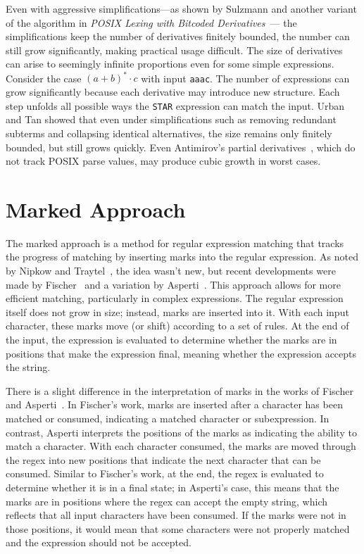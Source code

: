 \documentclass[12pt]{article}
\begin{document}
Even with aggressive simplifications—as shown by Sulzmann and another variant of the algorithm in \emph{POSIX Lexing with Bitcoded Derivatives}~\cite{TanAndUrban2023}— 
the simplifications keep the number of derivatives finitely bounded, the number can still grow significantly, making practical usage difficult.
The size of derivatives can arise to seemingly infinite proportions even for some simple expressions. Consider the case \( (a + b)^* \cdot c \)
with input \texttt{aaac}. The number of expressions can grow significantly because each derivative may introduce new structure. Each step 
unfolds all possible ways the \texttt{STAR} expression can match the input. Urban and Tan showed that even under simplifications such as 
removing redundant subterms and collapsing identical alternatives, the size remains only finitely bounded, but still grows quickly.
Even Antimirov’s partial derivatives~\cite{Antimirov1996}, which do not track POSIX parse values, may produce cubic growth in worst cases.

\section{Marked Approach}

The marked approach is a method for regular expression matching that tracks the progress of matching by inserting marks into the regular expression.
As noted by Nipkow and Traytel~\cite{NipkowTraytel2014}, the idea wasn't new, but recent developments were made by Fischer~\cite{Fischer2010} and a 
variation by Asperti~\cite{Asperti2010}. This approach allows for more efficient matching, particularly in complex expressions. The regular expression
itself does not grow in size; instead, marks are inserted into it. With each input character, these marks move (or shift) according to a set of rules.
At the end of the input, the expression is evaluated to determine whether the marks are in positions that make the expression final, meaning whether 
the expression accepts the string.
 
There is a slight difference in the interpretation of marks in the works of Fischer~\cite{Fischer2010} and Asperti~\cite{Asperti2010}.
In Fischer's work, marks are inserted after a character has been matched or consumed, indicating a matched character or subexpression. 
In contrast, Asperti interprets the positions of the marks as indicating the ability to match a character. With each character consumed,
the marks are moved through the regex into new positions that indicate the next character that can be consumed. Similar to Fischer’s work,
at the end, the regex is evaluated to determine whether it is in a final state; in Asperti’s case, this means that the marks are in positions 
where the regex can accept the empty string, which reflects that all input characters have been consumed. If the marks were not in those positions,
it would mean that some characters were not properly matched and the expression should not be accepted.
\end{document}
